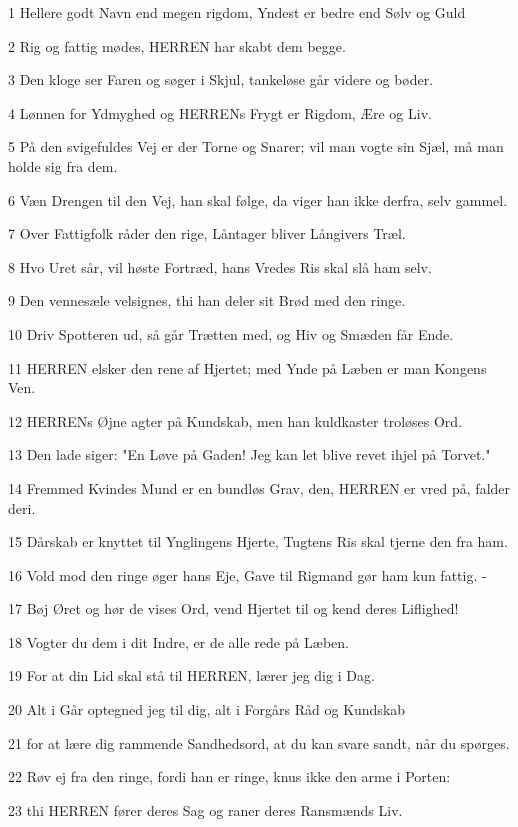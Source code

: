 \par 1 Hellere godt Navn end megen rigdom, Yndest er bedre end Sølv og Guld
\par 2 Rig og fattig mødes, HERREN har skabt dem begge.
\par 3 Den kloge ser Faren og søger i Skjul, tankeløse går videre og bøder.
\par 4 Lønnen for Ydmyghed og HERRENs Frygt er Rigdom, Ære og Liv.
\par 5 På den svigefuldes Vej er der Torne og Snarer; vil man vogte sin Sjæl, må man holde sig fra dem.
\par 6 Væn Drengen til den Vej, han skal følge, da viger han ikke derfra, selv gammel.
\par 7 Over Fattigfolk råder den rige, Låntager bliver Långivers Træl.
\par 8 Hvo Uret sår, vil høste Fortræd, hans Vredes Ris skal slå ham selv.
\par 9 Den vennesæle velsignes, thi han deler sit Brød med den ringe.
\par 10 Driv Spotteren ud, så går Trætten med, og Hiv og Smæden får Ende.
\par 11 HERREN elsker den rene af Hjertet; med Ynde på Læben er man Kongens Ven.
\par 12 HERRENs Øjne agter på Kundskab, men han kuldkaster troløses Ord.
\par 13 Den lade siger: "En Løve på Gaden! Jeg kan let blive revet ihjel på Torvet."
\par 14 Fremmed Kvindes Mund er en bundløs Grav, den, HERREN er vred på, falder deri.
\par 15 Dårskab er knyttet til Ynglingens Hjerte, Tugtens Ris skal tjerne den fra ham.
\par 16 Vold mod den ringe øger hans Eje, Gave til Rigmand gør ham kun fattig. -
\par 17 Bøj Øret og hør de vises Ord, vend Hjertet til og kend deres Liflighed!
\par 18 Vogter du dem i dit Indre, er de alle rede på Læben.
\par 19 For at din Lid skal stå til HERREN, lærer jeg dig i Dag.
\par 20 Alt i Går optegned jeg til dig, alt i Forgårs Råd og Kundskab
\par 21 for at lære dig rammende Sandhedsord, at du kan svare sandt, når du spørges.
\par 22 Røv ej fra den ringe, fordi han er ringe, knus ikke den arme i Porten:
\par 23 thi HERREN fører deres Sag og raner deres Ransmænds Liv.
